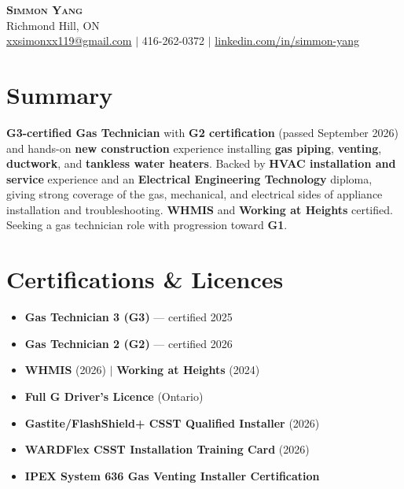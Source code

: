 \documentclass[letterpaper,11pt]{article}
\begin{document}
\begin{center}
    \textbf{\Huge \scshape Simmon Yang} \\ \vspace{1pt}
    Richmond Hill, ON \\
    \href{mailto:xxsimonxx119@gmail.com}{xxsimonxx119@gmail.com} $|$ 416-262-0372 $|$
    \href{https://www.linkedin.com/in/simmon-yang/}{linkedin.com/in/simmon-yang}
\end{center}

\section{Summary}
\textbf{G3-certified Gas Technician} with \textbf{G2 certification} (passed September 2026) and hands-on \textbf{new construction} experience installing \textbf{gas piping}, \textbf{venting}, \textbf{ductwork}, and \textbf{tankless water heaters}. Backed by \textbf{HVAC installation and service} experience and an \textbf{Electrical Engineering Technology} diploma, giving strong coverage of the gas, mechanical, and electrical sides of appliance installation and troubleshooting. \textbf{WHMIS} and \textbf{Working at Heights} certified. Seeking a gas technician role with progression toward \textbf{G1}.

\section{Certifications \& Licences}
\begin{itemize}[leftmargin=0.15in]
  \item \textbf{Gas Technician 3 (G3)} --- certified 2025
  \item \textbf{Gas Technician 2 (G2)} --- certified 2026
  \item \textbf{WHMIS} (2026) $|$ \textbf{Working at Heights} (2024)
  \item \textbf{Full G Driver's Licence} (Ontario)
  \item \textbf{Gastite/FlashShield+ CSST Qualified Installer} (2026)
  \item \textbf{WARDFlex CSST Installation Training Card} (2026)
  \item \textbf{IPEX System 636 Gas Venting Installer Certification}
\end{itemize}

\end{document}
